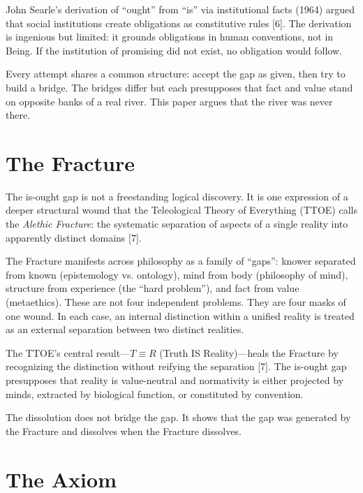 \documentclass[12pt, letterpaper]{article}
\begin{document}
John Searle's derivation of ``ought'' from ``is'' via institutional facts (1964) argued that social institutions create obligations as constitutive rules [6]. The derivation is ingenious but limited: it grounds obligations in human conventions, not in Being. If the institution of promising did not exist, no obligation would follow.

Every attempt shares a common structure: accept the gap as given, then try to build a bridge. The bridges differ but each presupposes that fact and value stand on opposite banks of a real river. This paper argues that the river was never there.

\section{The Fracture}

The is-ought gap is not a freestanding logical discovery. It is one expression of a deeper structural wound that the Teleological Theory of Everything (TTOE) calls the \textit{Alethic Fracture}: the systematic separation of aspects of a single reality into apparently distinct domains [7].

The Fracture manifests across philosophy as a family of ``gaps'': knower separated from known (epistemology vs. ontology), mind from body (philosophy of mind), structure from experience (the ``hard problem''), and fact from value (metaethics). These are not four independent problems. They are four masks of one wound. In each case, an internal distinction within a unified reality is treated as an external separation between two distinct realities.

The TTOE's central result---$T \equiv R$ (Truth IS Reality)---heals the Fracture by recognizing the distinction without reifying the separation [7]. The is-ought gap presupposes that reality is value-neutral and normativity is either projected by minds, extracted by biological function, or constituted by convention.

The dissolution does not bridge the gap. It shows that the gap was generated by the Fracture and dissolves when the Fracture dissolves.

\section{The Axiom}
\end{document}
